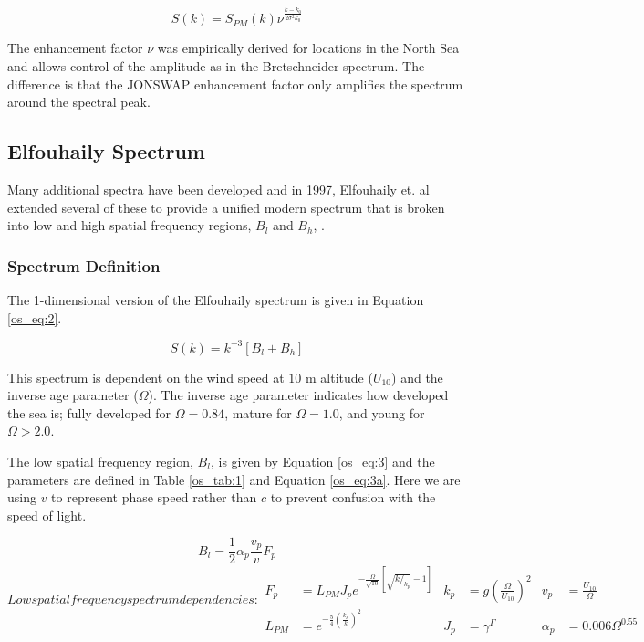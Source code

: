 \begin{equation}
  \label{os_eq:1b}
  S(k) = S_{PM}(k)\nu^{\frac{k-k_0}{2\sigma^2k_0}} 
  \end{equation}
  
The enhancement factor $\nu$ was empirically derived for locations in the North Sea and allows control of the amplitude as in the Bretschneider spectrum. The difference is that the JONSWAP enhancement factor only amplifies the spectrum around the spectral peak.

\subsection {Elfouhaily Spectrum}
Many additional spectra have been developed and in 1997, Elfouhaily et. al extended several of these to provide a unified modern spectrum that is broken into low and high spatial frequency regions, $B_l$ and $B_h$, \cite{elfouhaily}. 

\subsubsection {Spectrum Definition}
The 1-dimensional version of the Elfouhaily spectrum is given in Equation \ref{os_eq:2}.

\begin{equation}
  \label{os_eq:2}
  S(k) = k^{-3}\left[B_l + B_h \right]
\end{equation}
\renewcommand{\baselinestretch}{2} \small\normalsize

This spectrum is dependent on the wind speed at $10$ m altitude ($U_{10}$) and the inverse age parameter ($\Omega$). The inverse age parameter indicates how developed the sea is; fully developed for $\Omega = 0.84$, mature for $\Omega = 1.0$, and young for $\Omega > 2.0$. 

The low spatial frequency region, $B_l$, is given by Equation \ref{os_eq:3} and the parameters are defined in Table \ref{os_tab:1} and Equation \ref{os_eq:3a}. Here we are using $v$ to represent phase speed rather than $c$ to prevent confusion with the speed of light.

\begin{equation}
  \label{os_eq:3}
 B_l = \frac{1}{2} \alpha_p \frac{v_p}{v} F_p
\end{equation}
\renewcommand{\baselinestretch}{2} \small\normalsize
\begin{subequations}
\label{os_eq:3a}
   Low spatial frequency spectrum dependencies:
\begin{align}
  F_p &= L_{PM}J_pe^{-\frac{\Omega}{\sqrt{10}}\left[\sqrt{k/_{k_p}} - 1 \right]} &  k_p &= g\left(\frac{\Omega}{U_{10}}\right)^2 & v_p &= \frac{U_{10}}{\Omega} \\
   L_{PM} &=e^{-\frac{5}{4}\left(\frac{k_p}{k} \right)^2} &  J_p &= \gamma^\Gamma  & \alpha_p &= 0.006\Omega^{0.55} 
\end{align}
\end{subequations}
\renewcommand{\baselinestretch}{2} \small\normalsize

